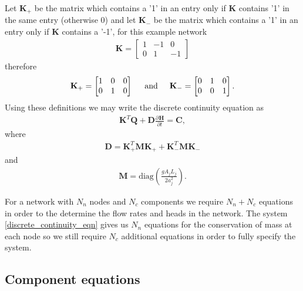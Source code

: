 \documentclass[12pt]{article}
\newcommand{\pardiv}[3]{\frac{\partial^{#1} #2}{\partial #3^{#1}}}
\begin{document}
Let $\mathbf{K}_+$ be the matrix which contains a '1' in an entry only if $\mathbf{K}$ contains '1' in the same entry (otherwise 0) and let $\mathbf{K}_-$ be the matrix which contains a '1' in an entry only if $\mathbf{K}$ contains a '-1', for this example network 
\begin{align*}
\mathbf{K} = \begin{bmatrix}
1 & -1 & 0 \\
0 & 1 & -1
\end{bmatrix}
\end{align*}
therefore
\begin{align*}
\mathbf{K}_+ = \begin{bmatrix}
1 & 0 & 0 \\
0 & 1 & 0
\end{bmatrix}
\hspace{0.5cm} \text{and} \hspace{0.5cm} \mathbf{K}_- = \begin{bmatrix}
0 & 1 & 0 \\
0 & 0 & 1
\end{bmatrix}.
\end{align*}
Using these definitions we may write the discrete continuity equation as 
\begin{align}\label{discrete_continuity_eqn}
\boxed{\mathbf{K}^T \mathbf{Q} + \mathbf{D} \pardiv{}{\mathbf{H}}{t} = \mathbf{C},}
\end{align}
where 
\begin{align*}
\mathbf{D} = \mathbf{K}_+^T \mathbf{M} \mathbf{K}_+ + \mathbf{K}_-^T \mathbf{M} \mathbf{K}_-
\end{align*}
and
\begin{align*}
\mathbf{M} = \text{diag}\left( \frac{gA_j L_j}{2 a_j^2}\right).
\end{align*}

For a network with $N_n$ nodes and $N_c$ components we require $N_n + N_c$ equations in order to the determine the flow rates and heads in the network. The system \eqref{discrete_continuity_eqn} gives us $N_n$ equations for the conservation of mass at each node so we still require $N_c$ additional equations in order to fully specify the system. 

\subsection{Component equations}
\end{document}
